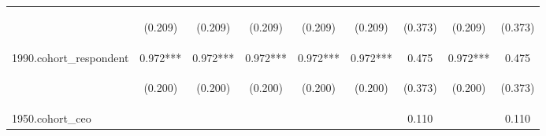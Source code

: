 \begin{center}
\begin{tabular}{lcccccccc}
\vspace{4pt} & \begin{footnotesize}(0.209)\end{footnotesize} & \begin{footnotesize}(0.209)\end{footnotesize} & \begin{footnotesize}(0.209)\end{footnotesize} & \begin{footnotesize}(0.209)\end{footnotesize} & \begin{footnotesize}(0.209)\end{footnotesize} & \begin{footnotesize}(0.373)\end{footnotesize} & \begin{footnotesize}(0.209)\end{footnotesize} & \begin{footnotesize}(0.373)\end{footnotesize} \\
1990.cohort\_respondent & 0.972*** & 0.972*** & 0.972*** & 0.972*** & 0.972*** & 0.475 & 0.972*** & 0.475 \\
\vspace{4pt} & \begin{footnotesize}(0.200)\end{footnotesize} & \begin{footnotesize}(0.200)\end{footnotesize} & \begin{footnotesize}(0.200)\end{footnotesize} & \begin{footnotesize}(0.200)\end{footnotesize} & \begin{footnotesize}(0.200)\end{footnotesize} & \begin{footnotesize}(0.373)\end{footnotesize} & \begin{footnotesize}(0.200)\end{footnotesize} & \begin{footnotesize}(0.373)\end{footnotesize} \\
1950.cohort\_ceo &  &  &  &  &  & 0.110 &  & 0.110 \\

\end{tabular}
\end{center}
